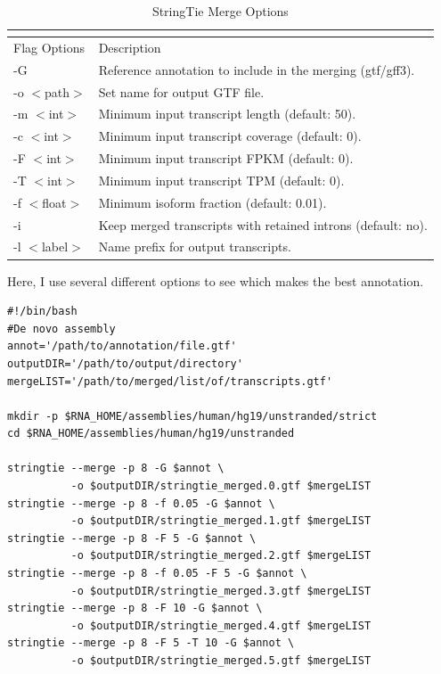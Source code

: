 \begin{longtabu} {X[1,l]X[4,l]}
  \caption{StringTie Merge Options}\\
  \label{stringtie merge}\\
  \toprule
  Flag Options  & Description\\
  \midrule
  \endhead
  -G            & Reference annotation to include in the merging (gtf/gff3).\\
  -o $<$path$>$ & Set name for output GTF file.\\
  -m $<$int$>$  & Minimum input transcript length (default: 50).\\
  -c $<$int$>$  & Minimum input transcript coverage (default: 0).\\
  -F $<$int$>$  & Minimum input transcript FPKM (default: 0).\\
  -T $<$int$>$  & Minimum input transcript TPM (default: 0).\\
  -f $<$float$>$& Minimum isoform fraction (default: 0.01).\\
  -i            & Keep merged transcripts with retained introns (default: no).\\
  -l $<$label$>$& Name prefix for output transcripts.\\
  \bottomrule
\end{longtabu}

Here, I use several different options to see which makes the best annotation.
\begin{verbatim}
#!/bin/bash
#De novo assembly
annot='/path/to/annotation/file.gtf'
outputDIR='/path/to/output/directory'
mergeLIST='/path/to/merged/list/of/transcripts.gtf'

mkdir -p $RNA_HOME/assemblies/human/hg19/unstranded/strict
cd $RNA_HOME/assemblies/human/hg19/unstranded

stringtie --merge -p 8 -G $annot \
          -o $outputDIR/stringtie_merged.0.gtf $mergeLIST
stringtie --merge -p 8 -f 0.05 -G $annot \
          -o $outputDIR/stringtie_merged.1.gtf $mergeLIST
stringtie --merge -p 8 -F 5 -G $annot \
          -o $outputDIR/stringtie_merged.2.gtf $mergeLIST
stringtie --merge -p 8 -f 0.05 -F 5 -G $annot \
          -o $outputDIR/stringtie_merged.3.gtf $mergeLIST
stringtie --merge -p 8 -F 10 -G $annot \
          -o $outputDIR/stringtie_merged.4.gtf $mergeLIST
stringtie --merge -p 8 -F 5 -T 10 -G $annot \
          -o $outputDIR/stringtie_merged.5.gtf $mergeLIST
\end{verbatim}

